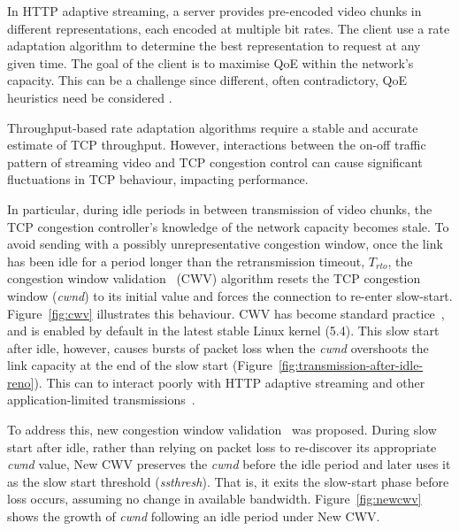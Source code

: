\documentclass[10pt,sigconf]{acmart}
\begin{document}
In HTTP adaptive streaming, a server provides pre-encoded video chunks in different representations, each encoded at multiple bit rates. The client use a rate adaptation algorithm to determine the best representation to request at any given time. The goal of the client is to maximise QoE within the network's capacity. This can be a challenge since different, often contradictory, QoE heuristics need be considered \cite{Seufert-2015-A-Survey-on-QoE-Dash}. 

Throughput-based rate adaptation algorithms require a stable and accurate estimate of TCP throughput. However, interactions between the on-off traffic pattern of streaming video and TCP congestion control can cause significant fluctuations in TCP behaviour, impacting performance.


In particular, during idle periods in between transmission of video chunks, the TCP congestion controller's knowledge of the network capacity becomes stale. To avoid sending with a possibly unrepresentative congestion window, once the link has been idle for a period longer than the retransmission timeout, $T_{rto}$, the congestion window validation~\cite{rfc2861-2000-padhye-congestion-window-validation} (CWV) algorithm resets the TCP congestion window (\emph{cwnd}) to its initial value and forces the connection to re-enter slow-start. Figure~\ref{fig:cwv} illustrates this behaviour. CWV has become standard practice~\cite{rfc5681-congeston-control}, and is enabled by default in the latest stable Linux kernel (5.4). This slow start after idle, however, causes bursts of packet loss when the \emph{cwnd} overshoots the link capacity at the end of the slow start (Figure~\ref{fig:transmission-after-idle-reno}). This can to interact poorly with HTTP adaptive streaming and other application-limited transmissions~\cite{Esteban-2012-Interactions-HTTP-TCP}.

To address this, new congestion window validation~\cite{rfc7661-2015-fairhurst-new-cwnd-validation} was proposed. During slow start after idle, rather than relying on packet loss to re-discover its appropriate \emph{cwnd} value, New CWV preserves the \emph{cwnd} before the idle period and later uses it as the slow start threshold (\emph{ssthresh}). That is, it exits the slow-start phase before loss occurs, assuming no change in available bandwidth. Figure~\ref{fig:newcwv} shows the growth of \emph{cwnd} following an idle period under New CWV.
\end{document}
